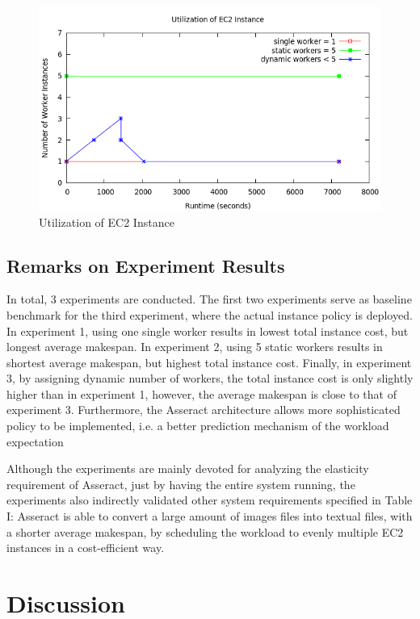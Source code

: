 \documentclass[conference]{IEEEtran}
\begin{document}
\begin{figure}[H]
\centering
        \includegraphics[totalheight=6cm,width=\linewidth]{instanceusage.png}
    \caption{Utilization of EC2 Instance}
    \label{fig:instanceusage}
\end{figure}

\subsection{Remarks on Experiment Results}\label{sec:experimentremark}
In total, 3 experiments are conducted. The first two experiments serve as baseline benchmark for the third experiment, where the actual instance policy is deployed.  In experiment 1, using one single worker results in lowest total instance cost, but longest average makespan. In experiment 2, using 5 static workers results in shortest average makespan, but highest total instance cost. Finally, in experiment 3, by assigning dynamic number of workers, the total instance cost is only slightly higher than in experiment 1, however, the average makespan is close to that of experiment 3. Furthermore, the Asseract architecture allows more sophisticated policy to be implemented, i.e. a better prediction mechanism of the workload expectation 

Although the experiments are mainly devoted for analyzing the elasticity requirement of Asseract, just by having the entire system running, the experiments also indirectly validated other system requirements specified in Table I: Asseract is able to convert a large amount of images files into textual files, with a shorter average makespan, by scheduling the workload to evenly multiple EC2 instances in a cost-efficient way.

\section{Discussion}
\end{document}
